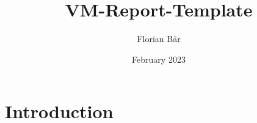 \documentclass{article}
\title{VM-Report-Template}
\author{Florian Bär}
\date{February 2023}
\begin{document}
\maketitle

\section{Introduction}
\end{document}
